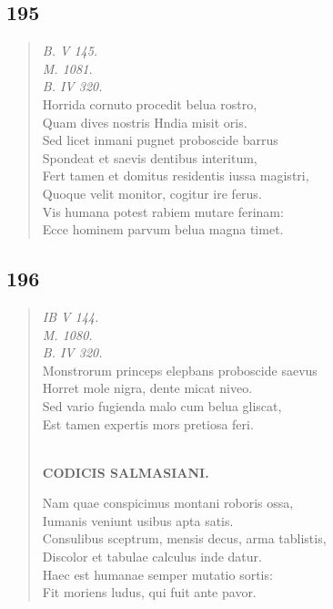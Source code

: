 \documentclass[11pt, a4paper]{report}
\begin{document}
            \subsection*{195}
      \begin{verse}
      \textit{B. V 145.} \\ \textit{M. 1081.} \\ \textit{B. IV 320.} \\ Horrida cornuto procedit belua rostro, \\ Quam dives nostris Hndia misit oris. \\ Sed licet inmani pugnet proboscide barrus \\ Spondeat et saevis dentibus interitum, \\ Fert tamen et domitus residentis iussa magistri, \\ Quoque velit monitor, cogitur ire ferus. \\ Vis humana potest rabiem mutare ferinam: \\ Ecce hominem parvum belua magna timet. \\ 
      \end{verse}
  
            \subsection*{196}
      \begin{verse}
      \textit{IB V 144.} \\ \textit{M. 1080.} \\ \textit{B. IV 320.} \\ Monstrorum princeps elepbans proboscide saevus \\ Horret mole nigra, dente micat niveo. \\ Sed vario fugienda malo cum belua gliscat, \\ Est tamen expertis mors pretiosa feri. \\ 
        ﻿\pagebreak 
    \begin{center} \textbf{CODICIS SALMASIANI.} \end{center} \marginpar{[161]} Nam quae conspicimus montani roboris ossa, \\ Iumanis veniunt usibus apta satis. \\ Consulibus sceptrum, mensis decus, arma tablistis, \\ Discolor et tabulae calculus inde datur. \\ Haec est humanae semper mutatio sortis: \\ Fit moriens ludus, qui fuit ante pavor. \\ 
      \end{verse}
  
\end{document}
